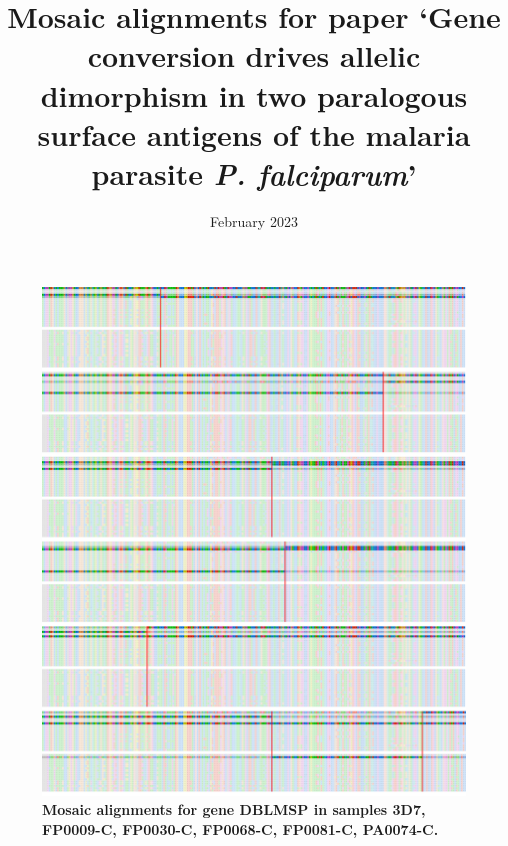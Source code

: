 \documentclass[12pt]{article}
\title{Mosaic alignments for paper `Gene conversion drives allelic dimorphism in two
paralogous surface antigens of the malaria parasite \textit{P. falciparum}'}
\date{February 2023}
\begin{document}
\maketitle

\graphicspath{{img/}}


\clearpage

\begin{figure}
    \centering
    \centerline{\includegraphics[width=1.2\textwidth]{DBLMSP_ref_FP0009-C_FP0030-C_FP0068-C_FP0081-C_PA0074-C.png}}
    \caption[Mosaic alignments (1)]{
        \textbf{Mosaic alignments for gene DBLMSP in samples 3D7, FP0009-C, FP0030-C,
        FP0068-C, FP0081-C, PA0074-C.}
        }
    \label{pa:fig:mosaic_app1}
\end{figure}
\end{document}

